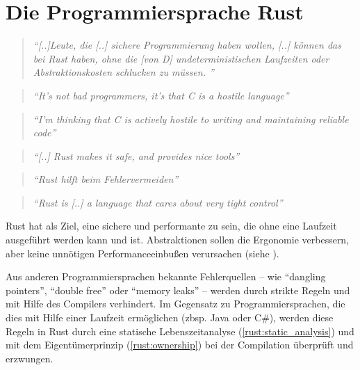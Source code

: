 
\chapter{Die Programmiersprache Rust}

\begin{quotation}
	\textit{\enquote{[..]Leute, die [..] sichere Programmierung haben wollen, [..] können das bei Rust haben, ohne die [von D] undeterministischen Laufzeiten oder Abstraktionskosten schlucken zu müssen. }}
	\cite{rust:fefe}
\end{quotation}

\begin{quotation}
	\textit{\enquote{It’s not bad programmers, it’s that C is a hostile language}} 
	\cite[54]{rust:c_is_hostile_mena}
\end{quotation}

\begin{quotation}
	\textit{\enquote{I’m thinking that C is actively hostile to writing and maintaining reliable code}} 
	\cite[129]{rust:c_is_hostile_mena}
\end{quotation}

\begin{quotation}
	\textit{\enquote{[..] Rust makes it safe, and  provides nice tools}} 
	\cite[130]{rust:c_is_hostile_mena}
\end{quotation}


\begin{quotation}
	\textit{\enquote{Rust hilft beim Fehlervermeiden}} 
	\cite{rust:c_is_hostile_golem}
\end{quotation}

\begin{quotation}
	\textit{\enquote{Rust is [..] a language that cares about very tight control}}
	\cite{rust:tight_control}
\end{quotation}

Rust hat als Ziel, eine sichere  und performante  zu sein, die ohne eine Laufzeit ausgeführt werden kann und  ist.
Abstraktionen sollen die Ergonomie verbessern, aber keine unnötigen Performanceeinbußen verursachen (siehe ).

Aus anderen Programmiersprachen bekannte Fehlerquellen -- wie \enquote{dangling pointers}, \enquote{double free} oder \enquote{memory leaks}  --  werden durch strikte Regeln und mit Hilfe des Compilers verhindert.
Im Gegensatz zu Programmiersprachen, die dies mit Hilfe einer Laufzeit ermöglichen (zbsp. Java oder C\#), werden diese Regeln in Rust durch eine statische Lebenszeitanalyse (\ref{rust:static_analysis}) und mit dem Eigentümerprinzip (\ref{rust:ownership}) bei der Compilation überprüft und erzwungen.

